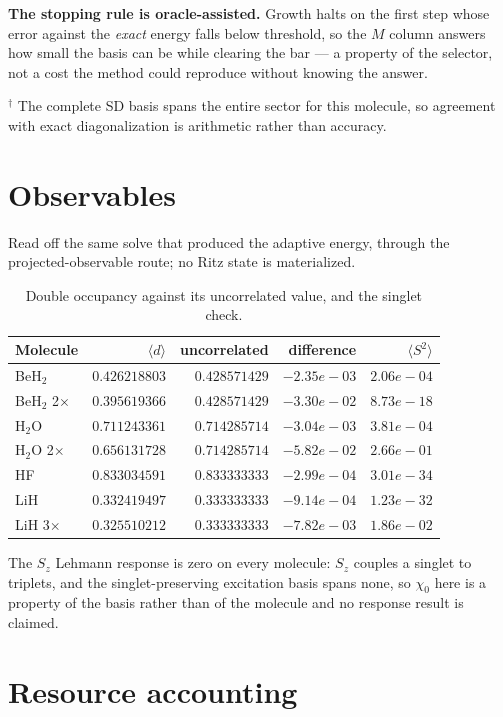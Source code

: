 \documentclass[11pt]{article}
\begin{document}
\noindent\textbf{The stopping rule is oracle-assisted.} Growth halts on the first step whose error against the \emph{exact} energy falls below threshold, so the $M$ column answers how small the basis can be while clearing the bar --- a property of the selector, not a cost the method could reproduce without knowing the answer.

\noindent$^\dagger$ The complete SD basis spans the entire sector for this molecule, so agreement with exact diagonalization is arithmetic rather than accuracy.

\section{Observables}

Read off the same solve that produced the adaptive energy, through the projected-observable route; no Ritz state is materialized.

\begin{table}[h]
\centering
\caption{Double occupancy against its uncorrelated value, and the singlet check.}
\begin{tabular}{lrrrr}
\toprule
Molecule & $\langle d \rangle$ & uncorrelated & difference & $\langle S^2 \rangle$ \\
\midrule
BeH$_2$ & $0.426218803$ & $0.428571429$ & $-2.35e-03$ & $2.06e-04$ \\
BeH$_2$ 2$\times$ & $0.395619366$ & $0.428571429$ & $-3.30e-02$ & $8.73e-18$ \\
H$_2$O & $0.711243361$ & $0.714285714$ & $-3.04e-03$ & $3.81e-04$ \\
H$_2$O 2$\times$ & $0.656131728$ & $0.714285714$ & $-5.82e-02$ & $2.66e-01$ \\
HF & $0.833034591$ & $0.833333333$ & $-2.99e-04$ & $3.01e-34$ \\
LiH & $0.332419497$ & $0.333333333$ & $-9.14e-04$ & $1.23e-32$ \\
LiH 3$\times$ & $0.325510212$ & $0.333333333$ & $-7.82e-03$ & $1.86e-02$ \\
\bottomrule
\end{tabular}
\end{table}

\noindent The $S_z$ Lehmann response is zero on every molecule: $S_z$ couples a singlet to triplets, and the singlet-preserving excitation basis spans none, so $\chi_0$ here is a property of the basis rather than of the molecule and no response result is claimed.

\section{Resource accounting}
\end{document}
